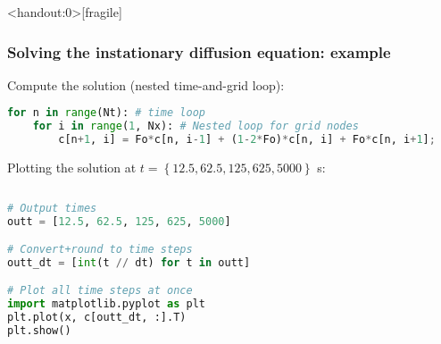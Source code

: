 \begin{frame}<handout:0>[fragile]
  \frametitle{Solving the instationary diffusion equation: example}
  Compute the solution (nested time-and-grid loop):
  \begin{lstlisting}[language=Python,basicstyle=\scriptsize\ttfamily]
for n in range(Nt): # time loop
    for i in range(1, Nx): # Nested loop for grid nodes
        c[n+1, i] = Fo*c[n, i-1] + (1-2*Fo)*c[n, i] + Fo*c[n, i+1];
  \end{lstlisting}
  \pause
  Plotting the solution at $t=\left\{12.5,62.5,125,625,5000\right\}$ \si{\second}:\\
  \begin{columns}[T]
    \begin{lstlisting}[language=Python,basicstyle=\scriptsize\ttfamily]
# Output times
outt = [12.5, 62.5, 125, 625, 5000]

# Convert+round to time steps
outt_dt = [int(t // dt) for t in outt]

# Plot all time steps at once
import matplotlib.pyplot as plt
plt.plot(x, c[outt_dt, :].T)
plt.show()
  \end{lstlisting}
  \end{columns}
\end{frame}


